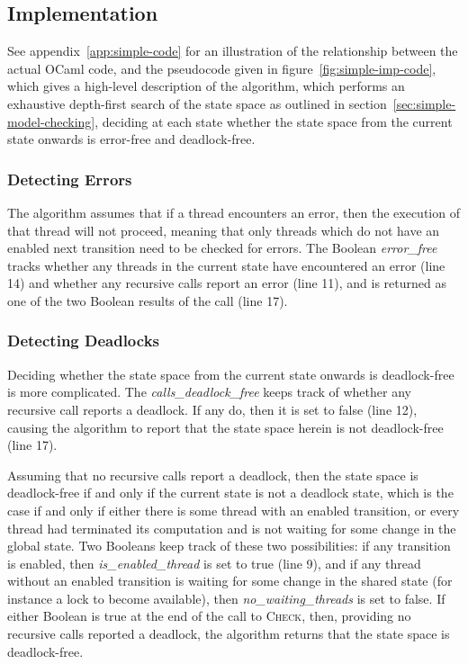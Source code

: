 \documentclass[12pt,a4paper,twoside,openright]{report}
\begin{document}
\subsection{Implementation}
\label{sec:simple-imp}

See appendix~\ref{app:simple-code} for an illustration
of the relationship between the actual OCaml
code, and the pseudocode given in
figure~\ref{fig:simple-imp-code}, which gives
a high-level description of the algorithm,
which performs an exhaustive depth-first
search of the state space as outlined in
section~\ref{sec:simple-model-checking},
deciding at each state whether the state space
from the current state onwards is error-free
and deadlock-free.

\subsubsection{Detecting Errors}

The algorithm assumes that if a thread
encounters an error, then the execution
of that thread will not proceed, meaning
that only threads which do not have an
enabled next transition need to be checked
for errors. The Boolean \textit{error\_free}
tracks whether any threads in the current state
have encountered an error (line 14) and whether any
recursive calls report an error (line 11), and is
returned as one of the two Boolean results
of the call (line 17).

\subsubsection{Detecting Deadlocks}

Deciding whether the state space from the current
state onwards is deadlock-free is more complicated.
The \textit{calls\_deadlock\_free} keeps track of
whether any recursive call reports a deadlock. If
any do, then it is set to false (line 12), causing the
algorithm to report that the state space herein
is not deadlock-free (line 17).

Assuming that no
recursive calls report a deadlock, then the state
space is deadlock-free if and only if the current
state is not a deadlock state, which is the case
if and only if either there is some thread with an
enabled transition,
or every thread had terminated its computation and
is not waiting for some change in the global state.
Two Booleans keep track of these two possibilities:
if any transition is enabled, then
\textit{is\_enabled\_thread} is set to true (line 9),
and if any thread without an enabled transition is
waiting for some change in the shared state (for
instance a lock to become available), then
\textit{no\_waiting\_threads} is set to false.
If either Boolean is true at the end of the call
to \textsc{Check}, then, providing no recursive
calls reported a deadlock, the algorithm returns
that the state space is deadlock-free.
\end{document}
